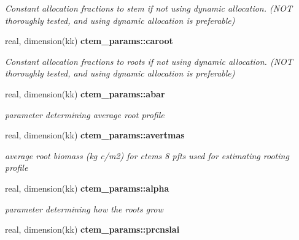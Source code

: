 \begin{DoxyCompactItemize}
\begin{DoxyCompactList}\small\item\em Constant allocation fractions to stem if not using dynamic allocation. (N\+O\+T thoroughly tested, and using dynamic allocation is preferable) \end{DoxyCompactList}\item 
\hypertarget{namespacectem__params_a80eaaf9535291c9113cb1014eea91ca6}{}real, dimension(kk) {\bfseries ctem\+\_\+params\+::caroot}\label{namespacectem__params_a80eaaf9535291c9113cb1014eea91ca6}

\begin{DoxyCompactList}\small\item\em Constant allocation fractions to roots if not using dynamic allocation. (N\+O\+T thoroughly tested, and using dynamic allocation is preferable) \end{DoxyCompactList}\item 
\hypertarget{namespacectem__params_a80132ab7ebb5d63e27978d1a13df0b80}{}real, dimension(kk) {\bfseries ctem\+\_\+params\+::abar}\label{namespacectem__params_a80132ab7ebb5d63e27978d1a13df0b80}

\begin{DoxyCompactList}\small\item\em parameter determining average root profile \end{DoxyCompactList}\item 
\hypertarget{namespacectem__params_ad1f59f53c14c2a0c09bfad6b11139bca}{}real, dimension(kk) {\bfseries ctem\+\_\+params\+::avertmas}\label{namespacectem__params_ad1f59f53c14c2a0c09bfad6b11139bca}

\begin{DoxyCompactList}\small\item\em average root biomass (kg c/m2) for ctem\textquotesingle{}s 8 pfts used for estimating rooting profile \end{DoxyCompactList}\item 
\hypertarget{namespacectem__params_aafa01f9ec060f116fdd559e2f9c8b32e}{}real, dimension(kk) {\bfseries ctem\+\_\+params\+::alpha}\label{namespacectem__params_aafa01f9ec060f116fdd559e2f9c8b32e}

\begin{DoxyCompactList}\small\item\em parameter determining how the roots grow \end{DoxyCompactList}\item 
\hypertarget{namespacectem__params_a2bc170a6ee30f73dba8ce44297493550}{}real, dimension(kk) {\bfseries ctem\+\_\+params\+::prcnslai}\label{namespacectem__params_a2bc170a6ee30f73dba8ce44297493550}


\end{DoxyCompactItemize}
